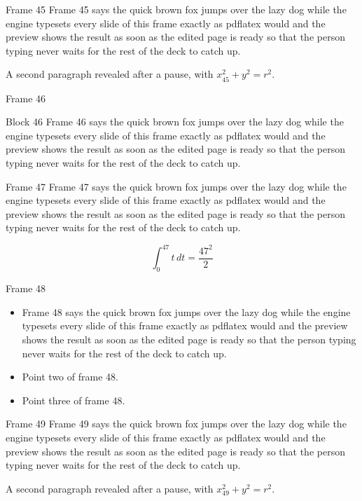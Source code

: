 \documentclass{beamer}
\begin{document}
\begin{frame}{Frame 45}
  Frame 45 says the quick brown fox jumps over the lazy dog while the engine typesets every slide of this frame exactly as pdflatex would and the preview shows the result as soon as the edited page is ready so that the person typing never waits for the rest of the deck to catch up.
  \pause

  A second paragraph revealed after a pause, with $x_{45}^2 + y^2 = r^2$.
\end{frame}
\begin{frame}{Frame 46}
  \begin{block}{Block 46}
    Frame 46 says the quick brown fox jumps over the lazy dog while the engine typesets every slide of this frame exactly as pdflatex would and the preview shows the result as soon as the edited page is ready so that the person typing never waits for the rest of the deck to catch up.
  \end{block}
\end{frame}
\begin{frame}{Frame 47}
  Frame 47 says the quick brown fox jumps over the lazy dog while the engine typesets every slide of this frame exactly as pdflatex would and the preview shows the result as soon as the edited page is ready so that the person typing never waits for the rest of the deck to catch up.

  \[ \int_0^{47} t\,dt = \frac{47^2}{2} \]
\end{frame}
\begin{frame}{Frame 48}
  \begin{itemize}
    \item<1-> Frame 48 says the quick brown fox jumps over the lazy dog while the engine typesets every slide of this frame exactly as pdflatex would and the preview shows the result as soon as the edited page is ready so that the person typing never waits for the rest of the deck to catch up.
    \item<2-> Point two of frame 48.
    \item<3-> Point three of frame 48.
  \end{itemize}
\end{frame}
\begin{frame}{Frame 49}
  Frame 49 says the quick brown fox jumps over the lazy dog while the engine typesets every slide of this frame exactly as pdflatex would and the preview shows the result as soon as the edited page is ready so that the person typing never waits for the rest of the deck to catch up.
  \pause

  A second paragraph revealed after a pause, with $x_{49}^2 + y^2 = r^2$.
\end{frame}
\end{document}

